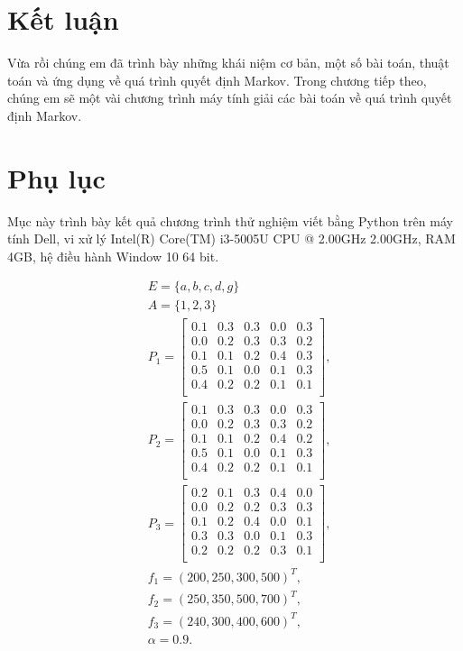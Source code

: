 \documentclass[12pt,a4paper]{report}
\begin{document}
	\chapter{Kết luận}
	\hspace{0.5 cm}
	Vừa rồi chúng em đã trình bày những khái niệm cơ bản, một số bài toán, thuật toán và ứng dụng về quá trình quyết định Markov.
	Trong chương tiếp theo, chúng em sẽ một vài chương trình máy tính giải các bài toán về quá trình quyết định Markov. 
	\chapter{Phụ lục}
	Mục này trình bày kết quả chương trình thử nghiệm viết bằng Python trên máy tính Dell, vi xử lý Intel(R) Core(TM) i3-5005U CPU @ 2.00GHz 2.00GHz, RAM 4GB, hệ điều hành Window 10 64 bit.
	
	\medskip
	\noindent
	\begin{align*}
	&E=\{a,b,c,d,g\}\\
	&A=\{1,2,3\}\\
	&P_1=\left[
	\begin{array}{ccccc}
	0.1&0.3&0.3&0.0&0.3\\
	0.0&0.2&0.3&0.3&0.2\\
	0.1&0.1&0.2&0.4&0.3\\
	0.5&0.1&0.0&0.1&0.3\\
	0.4&0.2&0.2&0.1&0.1\\
	\end{array}
	\right],\\
    &P_2=\left[
	\begin{array}{ccccc}
	0.1&0.3&0.3&0.0&0.3\\
	0.0&0.2&0.3&0.3&0.2\\
	0.1&0.1&0.2&0.4&0.2\\
	0.5&0.1&0.0&0.1&0.3\\
	0.4&0.2&0.2&0.1&0.1\\
	\end{array}
	\right],
	\end{align*}
	\begin{align*}
	 &P_3=\left[
	\begin{array}{ccccc}
		0.2&0.1&0.3&0.4&0.0\\
		0.0&0.2&0.2&0.3&0.3\\
		0.1&0.2&0.4&0.0&0.1\\
		0.3&0.3&0.0&0.1&0.3\\
		0.2&0.2&0.2&0.3&0.1\\
	\end{array}
	\right],\\
	&f_1=(200,250,300,500)^T,\\
	&f_2=(250, 350, 500,700)^T,\\
	&f_3=(240, 300, 400, 600)^T,\\
	& \alpha=0.9.
	\end{align*}
\end{document}
